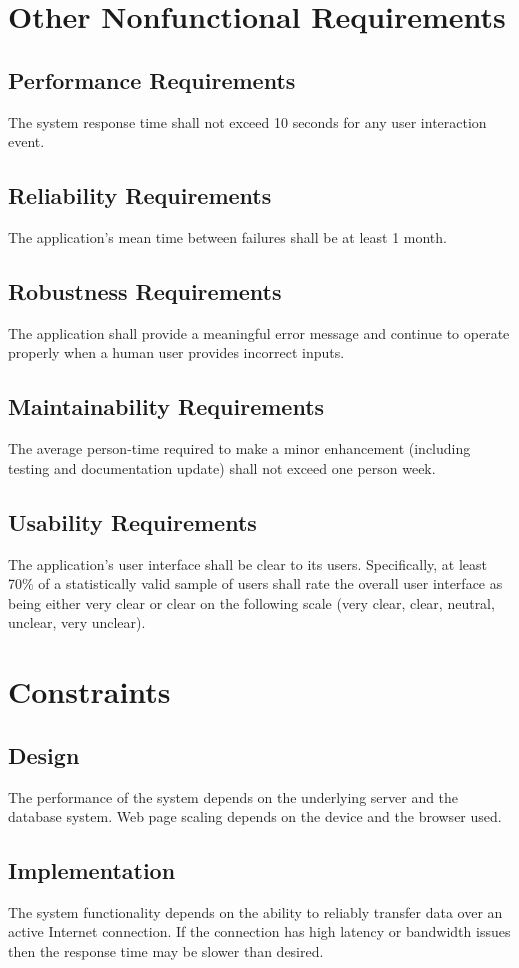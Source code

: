 \documentclass{scrreprt}
\begin{document}
\chapter{Other Nonfunctional Requirements}

\section{Performance Requirements}
The system response time shall not exceed 10 seconds for any user interaction event.

\section{Reliability Requirements}
The application’s mean time between failures shall be at least 1 month.

\section{Robustness Requirements}
The application shall provide a meaningful error message and continue to operate properly when a human user provides incorrect inputs.

\section{Maintainability Requirements}
The average person-time required to make a minor enhancement (including testing and documentation update) shall not exceed one person week.

\section{Usability Requirements}
The application’s user interface shall be clear to its users.
Specifically, at least 70\% of a statistically valid sample of users shall rate the overall user interface as being either very clear or clear on the following scale (very clear, clear, neutral, unclear, very unclear).

\chapter{Constraints}

\section{Design}
The performance of the system depends on the underlying server and the database system.
Web page scaling depends on the device and the browser used.

\section{Implementation}
The system functionality depends on the ability to reliably transfer data over an active Internet connection. If the connection has high latency or bandwidth issues then the response time may be slower than desired.

\nocite{ieee}



\end{document}
